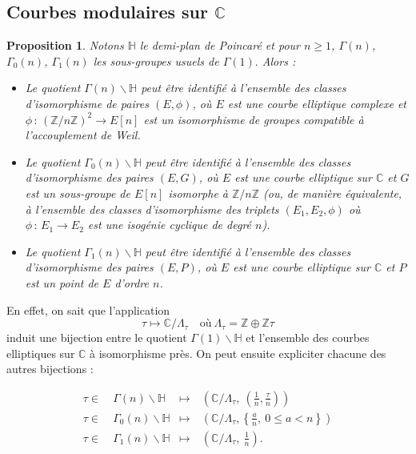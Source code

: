 \documentclass[11pt,a4paper]{article}
\newcommand{\Z}{\mathbb{Z}}
\newcommand{\C}{\mathbb{C}}
\renewcommand{\H}{\mathbb{H}}
\renewcommand{\b}{\backslash}
\newcommand{\vers}{\longrightarrow}
\newcommand{\de}{\,:\,}
\newtheorem*{prop}{Proposition}
\theoremstyle{definition}
\begin{document}
\subsection{Courbes modulaires sur $\C$}

\begin{prop}

Notons $\H$ le demi-plan de Poincaré et pour $n\geq 1$, $\Gamma(n)$, $\Gamma_0(n)$, $\Gamma_1(n)$ les sous-groupes usuels de $\Gamma(1).$ Alors :

\begin{itemize}
\item[•] Le quotient $\Gamma(n)\b \H$ peut être identifié à l'ensemble des classes d'isomorphisme de paires $(E,\phi)$, où $E$ est une courbe elliptique complexe et $\phi\de (\Z/n\Z)^2\vers E[n]$ est un isomorphisme de groupes compatible à l'accouplement de Weil.
\item[•] Le quotient $\Gamma_0(n)\b \H$ peut être identifié à l'ensemble des classes d'isomorphisme des paires $(E,G)$, où $E$ est une courbe elliptique sur $\C$ et $G$ est un sous-groupe de $E[n]$ isomorphe à $\Z/n\Z$ (ou, de manière équivalente, à l'ensemble des classes d'isomorphisme des triplets $(E_1, E_2, \phi)$ où $\phi\de E_1\vers E_2$ est une isogénie cyclique de degré $n$).
\item[•] Le quotient $\Gamma_1(n)\b \H$ peut être identifié à l'ensemble des classes d'isomorphisme des paires $(E,P)$, où $E$ est une courbe elliptique sur $\C$ et $P$ est un point de $E$ d'ordre $n$.
\end{itemize}

\end{prop}

En effet, on sait que l'application
$$\tau \longmapsto \C/\Lambda_\tau\quad \text{où}\ \Lambda_\tau = \Z \oplus \Z\tau$$
induit une bijection entre le quotient $\Gamma(1)\b \H$ et l'ensemble des courbes elliptiques sur $\C$ à isomorphisme près. On peut ensuite expliciter chacune des autres bijections :

$$\begin{aligned}
\tau\in\ &\Gamma(n)\b \H &\longmapsto\ &\left(\C/\Lambda_\tau,\ \left(\frac{1}{n},\frac{\tau}{n}\right)\right) \\
\tau\in\ &\Gamma_0(n)\b \H &\longmapsto\ &\left(\C/\Lambda_\tau, \left\{\frac{a}{n},\ 0\leq a<n\right\} \right) \\
\tau\in\ &\Gamma_1(n)\b \H &\longmapsto\ &\left(\C/\Lambda_\tau,\ \frac{1}{n}\right).
\end{aligned}$$
\end{document}
